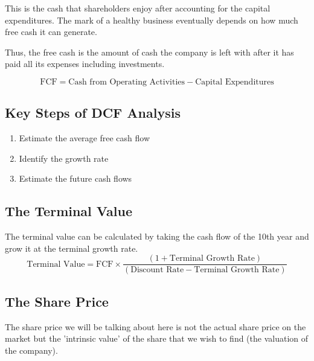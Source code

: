 This is the cash that shareholders enjoy after accounting for the capital expenditures. The mark of a healthy business eventually depends on how much free cash it can generate.

Thus, the free cash is the amount of cash the company is left with after it has paid all its expenses including investments.

\begin{displaymath}
  \textrm{FCF} = \textrm{Cash from Operating Activities} - \textrm{Capital Expenditures}
\end{displaymath}

\subsection{Key Steps of DCF Analysis}
\begin{enumerate}
  \item Estimate the average free cash flow
  \item Identify the growth rate
  \item Estimate the future cash flows
\end{enumerate}

\subsection{The Terminal Value}



The terminal value can be calculated by taking the cash flow of the 10th year and grow it at the terminal growth rate.
\begin{displaymath}
  \textrm{Terminal Value} = \textrm{FCF} \times \frac{(1 + \textrm{Terminal Growth Rate})}{(\textrm{Discount Rate} - \textrm{Terminal Growth Rate})}
\end{displaymath}


\subsection{The Share Price}
The share price we will be talking about here is not the actual share price on the market but the 'intrinsic value' of the share that we wish to find (the valuation of the company).

